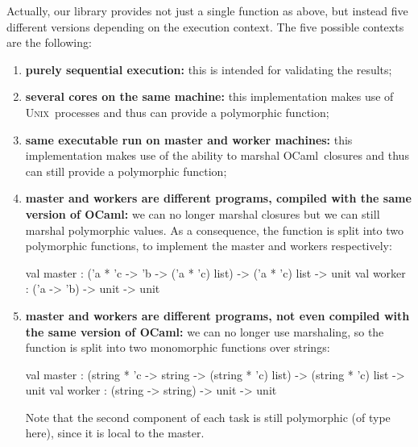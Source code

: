 \documentclass[preprint]{sigplanconf}
\newcommand{\Ocaml}{OCaml}
\newcommand{\unix}{\textsc{Unix}}
\begin{document}
Actually, our library provides not just a single 
function as above, but instead five different versions
depending on the execution context. 
The five possible contexts are the following: 
\begin{enumerate}
\item \textbf{purely sequential execution:}
  this is intended for validating the results;

\item \textbf{several cores on the same machine:} 
  this implementation makes use of \unix\ processes and thus can
  provide a polymorphic  function;

\item \textbf{same executable run on master and worker machines:}
  this implementation makes use of the ability to marshal \Ocaml\
  closures and thus can still provide a polymorphic  function;

\item \textbf{master and workers are different programs, compiled with
    the same version of \Ocaml:} 
  we can no longer marshal closures but we can still
  marshal polymorphic values. As a consequence, 
  the  function is split into two
  polymorphic functions, to implement the master and workers 
  respectively:%
\begin{ocaml}
val master : 
  ('a * 'c -> 'b -> ('a * 'c) list) -> 
  ('a * 'c) list -> unit
val worker : ('a -> 'b) -> unit -> unit
\end{ocaml}
\item \textbf{master and workers are different programs, not even
    compiled with the same version of \Ocaml:} we can no
  longer use marshaling, so the
   function is split into two monomorphic functions
  over strings:%
\begin{ocaml}
val master : 
  (string * 'c -> string -> (string * 'c) list) -> 
  (string * 'c) list -> unit
val worker : (string -> string) -> unit -> unit
\end{ocaml}
  Note that the second component of each task is still polymorphic (of
  type \ocaml{'c} here), since it is local to the master.
\end{enumerate}
\end{document}
